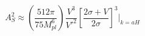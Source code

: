\begin{equation}\label{scalaramplitude}
A_S^2 \approx \left( \frac{512 \pi}{75 M_{pl}^6} \right) 
\frac{V^3}{V'^2} \left[\frac{2\sigma + V}{2\sigma}\right]^3 
|_{k=aH}
\end{equation}

